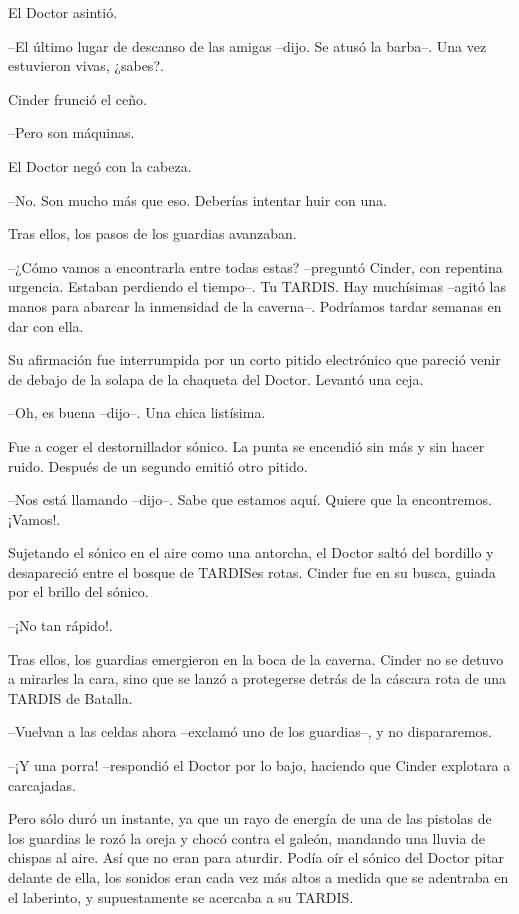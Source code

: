 El Doctor asintió.

--El último lugar de descanso de las amigas --dijo. Se atusó la barba--. Una vez estuvieron vivas, ¿sabes?.

Cinder frunció el ceño.

--Pero son máquinas.

El Doctor negó con la cabeza.

--No. Son mucho más que eso. Deberías intentar huir con una.

Tras ellos, los pasos de los guardias avanzaban.

--¿Cómo vamos a encontrarla entre todas estas? --preguntó Cinder, con repentina urgencia. Estaban perdiendo el tiempo--. Tu TARDIS. Hay muchísimas --agitó las manos para abarcar la inmensidad de la caverna--. Podríamos tardar semanas en dar con ella.

Su afirmación fue interrumpida por un corto pitido electrónico que pareció venir de debajo de la solapa de la chaqueta del Doctor. Levantó una ceja.

--Oh, es buena --dijo--. Una chica listísima. 

Fue a coger el destornillador sónico. La punta se encendió sin más y sin hacer ruido. Después de un segundo emitió otro pitido.

--Nos está llamando --dijo--. Sabe que estamos aquí. Quiere que la encontremos. ¡Vamos!.

Sujetando el sónico en el aire como una antorcha, el Doctor saltó del bordillo y desapareció entre el bosque de TARDISes rotas. Cinder fue en su busca, guiada por el brillo del sónico.

--¡No tan rápido!.

Tras ellos, los guardias emergieron en la boca de la caverna. Cinder no se detuvo a mirarles la cara, sino que se lanzó a protegerse detrás de la cáscara rota de una TARDIS de Batalla.

--Vuelvan a las celdas ahora --exclamó uno de los guardias--, y no dispararemos.

--¡Y una porra! --respondió el Doctor por lo bajo, haciendo que Cinder explotara a carcajadas.

Pero sólo duró un instante, ya que un rayo de energía de una de las pistolas de los guardias le rozó la oreja y chocó contra el galeón, mandando una lluvia de chispas al aire.
Así que no eran para aturdir.
Podía oír el sónico del Doctor pitar delante de ella, los sonidos eran cada vez más altos a medida que se adentraba en el laberinto, y supuestamente se acercaba a su TARDIS.

